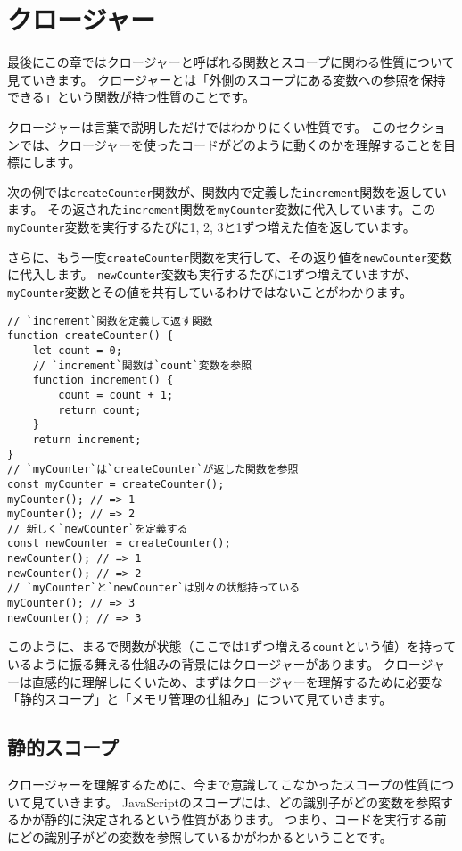 \hypertarget{closure}{%
\section{クロージャー}\label{closure}}

最後にこの章ではクロージャーと呼ばれる関数とスコープに関わる性質について見ていきます。
クロージャーとは「外側のスコープにある変数への参照を保持できる」という関数が持つ性質のことです。

クロージャーは言葉で説明しただけではわかりにくい性質です。
このセクションでは、クロージャーを使ったコードがどのように動くのかを理解することを目標にします。

次の例では\texttt{createCounter}関数が、関数内で定義した\texttt{increment}関数を返しています。
その返された\texttt{increment}関数を\texttt{myCounter}変数に代入しています。この\texttt{myCounter}変数を実行するたびに1,
2, 3と1ずつ増えた値を返しています。

さらに、もう一度\texttt{createCounter}関数を実行して、その返り値を\texttt{newCounter}変数に代入します。
\texttt{newCounter}変数も実行するたびに1ずつ増えていますが、\texttt{myCounter}変数とその値を共有しているわけではないことがわかります。

\begin{lstlisting}
// `increment`関数を定義して返す関数
function createCounter() {
    let count = 0;
    // `increment`関数は`count`変数を参照
    function increment() {
        count = count + 1;
        return count;
    }
    return increment;
}
// `myCounter`は`createCounter`が返した関数を参照
const myCounter = createCounter();
myCounter(); // => 1
myCounter(); // => 2
// 新しく`newCounter`を定義する
const newCounter = createCounter();
newCounter(); // => 1
newCounter(); // => 2
// `myCounter`と`newCounter`は別々の状態持っている
myCounter(); // => 3
newCounter(); // => 3
\end{lstlisting}

このように、まるで関数が状態（ここでは1ずつ増える\texttt{count}という値）を持っているように振る舞える仕組みの背景にはクロージャーがあります。
クロージャーは直感的に理解しにくいため、まずはクロージャーを理解するために必要な「静的スコープ」と「メモリ管理の仕組み」について見ていきます。

\hypertarget{static-scope}{%
\subsection{静的スコープ}\label{static-scope}}

クロージャーを理解するために、今まで意識してこなかったスコープの性質について見ていきます。
JavaScriptのスコープには、どの識別子がどの変数を参照するかが静的に決定されるという性質があります。
つまり、コードを実行する前にどの識別子がどの変数を参照しているかがわかるということです。

